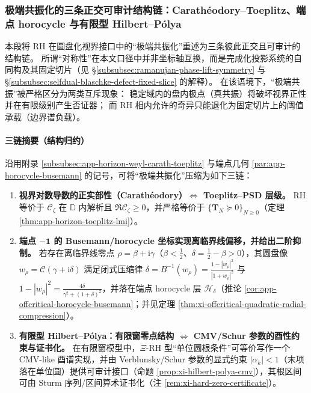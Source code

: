 \subsubsection{极端共振化的三条正交可审计结构链：Carath\'eodory--Toeplitz、端点 horocycle 与有限型 Hilbert--P{\'o}lya}\label{subsubsec:xi-extreme-resonance-orthogonal-audit-chains}
本段将 RH 在圆盘化视界接口中的“极端共振化”重述为三条彼此正交且可审计的结构链。
所谓“对称性”在本文口径中并非坐标轴互换，而是完成化投影系统的自同构及其固定切片（见 \S\ref{subsubsec:ramanujan-phase-lift-symmetry} 与 \S\ref{subsubsec:selfdual-blaschke-defect-fixed-slice} 的解释）。
在该语境下，“极端共振”被严格区分为两类互斥现象：
稳定域内的盘内极点（真共振）将破坏视界正性并在有限级别产生否证器；
而 RH 相内允许的奇异只能退化为固定切片上的阈值承载（边界谱负载）。

\paragraph{三链摘要（结构归约）}
沿用附录 \ref{subsubsec:app-horizon-weyl-carath-toeplitz} 与端点几何 \ref{par:app-horocycle-busemann} 的记号，可将“极端共振化”压缩为如下三链：
\begin{enumerate}
  \item \textbf{视界对数导数的正实部性（Carath\'eodory）\(\Longleftrightarrow\) Toeplitz--PSD 层级。}
  RH 等价于 \(\mathscr{C}_{\zeta}\) 在 \(\mathbb{D}\) 内解析且 \(\Re \mathscr{C}_{\zeta}\ge 0\)，并严格等价于 \(\{\mathbf{T}_N\succeq 0\}_{N\ge 0}\)（定理 \ref{thm:app-horizon-toeplitz-lmi}）。
  \item \textbf{端点 \(\boldsymbol{-1}\) 的 Busemann/horocycle 坐标实现离临界线偏移，并给出二阶抑制。}
  若存在离临界线零点 \(\rho=\beta+\mathrm{i}\gamma\)（\(\beta<\tfrac12\)、\(\delta=\tfrac12-\beta>0\)），其圆盘像 \(w_\rho=\mathcal{C}(\gamma+\mathrm{i}\delta)\) 满足闭式压缩律
  \(\delta=B^{-1}(w_\rho)=\frac{1-|w_\rho|^2}{|1+w_\rho|^2}\) 与
  \(1-|w_\rho|^2=\frac{4\delta}{\gamma^2+(1+\delta)^2}\)，并落在端点 horocycle 层 \(\mathcal{H}_\delta\)（推论 \ref{cor:app-offcritical-horocycle-busemann}；并见定理 \ref{thm:xi-offcritical-quadratic-radial-compression}）。
  \item \textbf{有限型 Hilbert--P{\'o}lya：有限窗零点结构 \(\Longleftrightarrow\) CMV/Schur 参数的酉性约束与证书化。}
  在有限窗模型中，\(\Xi\)-RH 型“单位圆根条件”可等价写作一个 CMV-like 酉谱实现，并由 Verblunsky/Schur 参数的显式约束 \(|\alpha_k|<1\)（末项落在单位圆）提供可审计接口（命题 \ref{prop:xi-hilbert-polya-cmv}），其根区间可由 Sturm 序列/区间算术证书化（注 \ref{rem:xi-hard-zero-certificate}）。
\end{enumerate}

